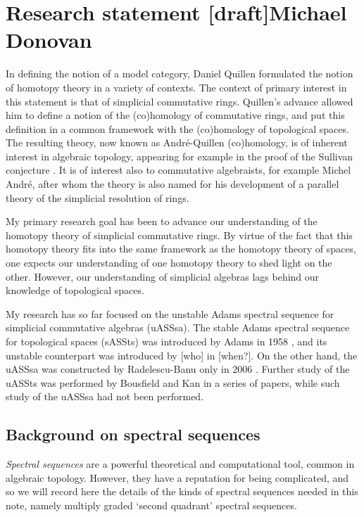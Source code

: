 \documentclass[11pt]{article}
\begin{document}
\section*{\huge Research statement [draft]\hfill\normalsize Michael Donovan} 

In defining the notion of a model category, Daniel Quillen \cite{QuillenHomAlg.pdf} formulated the notion of homotopy theory in a variety of contexts. The context of primary interest in this statement is that of simplicial commutative rings. Quillen's advance allowed him to define a notion of the (co)homology of commutative rings, and put this definition in a common framework with the (co)homology of topological spaces. The resulting theory, now known as Andr\'e-Quillen (co)homology, is of inherent interest in algebraic topology, appearing for example in the proof of the Sullivan conjecture \cite{MillerSullivanConjecture.pdf}. It is of interest also to commutative algebraists, for example Michel Andr\'e, after whom the theory is also named for his development of a parallel theory of the simplicial resolution of rings.

My primary research goal has been to advance our understanding of the homotopy theory of simplicial commutative rings. By virtue of the fact that this homotopy theory fits into the same framework as the homotopy theory of spaces, one expects our understanding of one homotopy theory to shed light on the other. However, our understanding of simplicial algebras lags behind our knowledge of topological spaces.

My research has so far focused on the unstable Adams spectral sequence for simplicial commutative algebras (uASSsa). The stable Adams spectral sequence for topological spaces (sASSts) was introduced by Adams in 1958 \cite{MR0096219}, and its unstable counterpart was introduced by [who] in [when?]. On the other hand, the uASSsa was constructed by Radelescu-Banu only in 2006 \cite{radelescuBanu.pdf}. Further study of the uASSts was performed by Bousfield and Kan in a series \cite{BousKanSSeq.pdf,BK_pairings.pdf, BK_pairings_products.pdf} of papers, while such study of the uASSsa had not been performed.
\subsection*{Background on spectral sequences}
\emph{Spectral sequences} are a powerful theoretical and computational tool, common in algebraic topology. However, they have a reputation for being complicated, and so we will record here the details of the kinds of spectral sequences needed in this note, namely multiply graded `second quadrant' spectral sequences.
\end{document}
